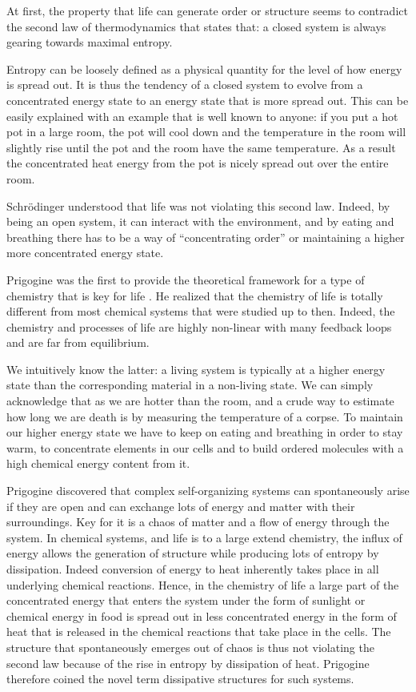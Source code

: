 \documentclass[
  11pt,
]{book}
\begin{document}
At first, the property that life can generate order or structure seems to contradict the second law of thermodynamics that states that: a closed system is always gearing towards maximal entropy.

Entropy can be loosely defined as a physical quantity for the level of how energy is spread out. It is thus the tendency of a closed system to evolve from a concentrated energy state to an energy state that is more spread out. This can be easily explained with an example that is well known to anyone: if you put a hot pot in a large room, the pot will cool down and the temperature in the room will slightly rise until the pot and the room have the same temperature. As a result the concentrated heat energy from the pot is nicely spread out over the entire room.

Schrödinger understood that life was not violating this second law. Indeed, by being an open system, it can interact with the environment, and by eating and breathing there has to be a way of ``concentrating order'' or maintaining a higher more concentrated energy state.

Prigogine was the first to provide the theoretical framework for a type of chemistry that is key for life \citep{prigogineStengers1984}. He realized that the chemistry of life is totally different from most chemical systems that were studied up to then. Indeed, the chemistry and processes of life are highly non-linear with many feedback loops and are far from equilibrium.

We intuitively know the latter: a living system is typically at a higher energy state than the corresponding material in a non-living state. We can simply acknowledge that as we are hotter than the room, and a crude way to estimate how long we are death is by measuring the temperature of a corpse. To maintain our higher energy state we have to keep on eating and breathing in order to stay warm, to concentrate elements in our cells and to build ordered molecules with a high chemical energy content from it.

Prigogine discovered that complex self-organizing systems can spontaneously arise if they are open and can exchange lots of energy and matter with their surroundings.
Key for it is a chaos of matter and a flow of energy through the system.
In chemical systems, and life is to a large extend chemistry, the influx of energy allows the generation of structure while producing lots of entropy by dissipation. Indeed conversion of energy to heat inherently takes place in all underlying chemical reactions. Hence, in the chemistry of life a large part of the concentrated energy that enters the system under the form of sunlight or chemical energy in food is spread out in less concentrated energy in the form of heat that is released in the chemical reactions that take place in the cells.
The structure that spontaneously emerges out of chaos is thus not violating the second law because of the rise in entropy by dissipation of heat.
Prigogine therefore coined the novel term dissipative structures for such systems.
\end{document}
